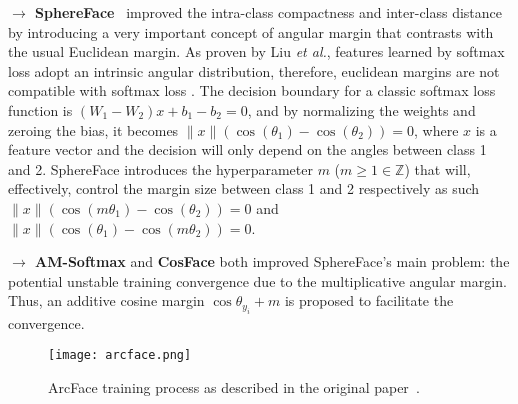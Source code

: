 \documentclass[class=report, crop=false, a4paper, 12pt]{standalone}
\begin{document}
\vspace{0.7\baselineskip}
\noindent\textbf{$\rightarrow$ SphereFace}~\autocite{liuSphereFaceDeepHypersphere2018} improved the intra-class compactness and inter-class distance by introducing a very important concept of angular margin that contrasts with the usual Euclidean margin. As proven by Liu \textit{et al.}, features learned by softmax loss adopt an intrinsic angular distribution, therefore, euclidean margins are not compatible with softmax loss . The decision boundary for a classic softmax loss function is $(W_1 - W_2)x+b_1-b_2=0$, and by normalizing the weights and zeroing the bias, it becomes $\|x\|(\cos{(\theta_1)}-\cos{(\theta_2)})=0$, where $x$ is a feature vector and the decision will only depend on the angles between class 1 and 2. SphereFace introduces the hyperparameter $m$ ($m\geq1 \in \mathbb{Z}$) that will, effectively, control the margin size between class 1 and 2 respectively as such $\|x\|(\cos{(m\theta_1)}-\cos{(\theta_2)})=0$ and $\|x\|(\cos{(\theta_1)}-\cos{(m\theta_2)})=0$.


\vspace{0.7\baselineskip}
\noindent\textbf{$\rightarrow$ AM-Softmax} and \textbf{CosFace} both improved SphereFace's main problem: the potential unstable training convergence due to the multiplicative angular margin. Thus, an additive cosine margin $\cos{\theta_{y_i}}+m$ is proposed to facilitate the convergence.

\begin{figure}[H]
    \centering
    \texttt{[image: arcface.png]}
    \caption{ArcFace training process as described in the original paper~\autocite{dengArcFaceAdditiveAngular}.}
    \label{fig:arcface}
\end{figure}
\end{document}
